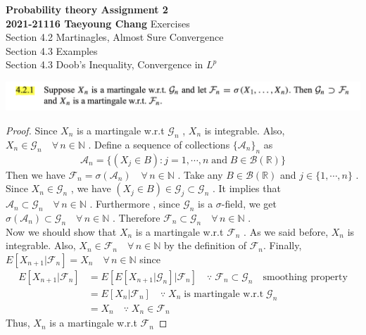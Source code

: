 \documentclass[12pt, A4]{article}
\newcommand{\N}{\mathbb{N}}
\newcommand{\R}{\mathbb{R}}
\newcommand{\A}{\mathcal{A}}
\newcommand{\B}{\mathcal{B}}
\newcommand{\G}{\mathcal{G}}
\newcommand{\F}{\mathcal{F}}
\newcommand{\foranyn}{\quad \forall \, n\in \N}
\begin{document}
\begin{titlepage}
	\begin{center}
		\vspace*{5cm}
		\textbf{\Large Probability theory \MakeUppercase{} Assignment 2}
		\\
		\vspace{1.5cm}
		\textbf{2021-21116 Taeyoung Chang}
		\vfill
		Exercises \\ Section 4.2 Martinagles, Almost Sure Convergence \\ Section 4.3 Examples \\ Section 4.3 Doob's Inequality, Convergence in $L^p$ 
	
		\vspace*{3cm}
		\thispagestyle{empty}
	\end{center}
\end{titlepage}

\includegraphics[width=17cm]{Exer4.2.1.png}

\begin{proof}
    Since $X_n$ is a martingale w.r.t $\G_n$ , $X_n$ is integrable. Also, $X_n\in \G_n\foranyn$ . Define a sequence of collections $\{\A_n\}_n$ as
    $$
        \A_n=\{(X_j\in B) : j=1, \cdots, n \; \text{and}\; B\in \B(\R)\}
    $$
    Then we have $\F_n=\sigma(\A_n)\foranyn$ . Take any $B\in \B(\R)$ and $j\in \{1, \cdots, n\}$ . Since $X_n\in \G_n$ , we have $(X_j\in B)\in \G_j\subset \G_n$ . It implies that $\A_n\subset \G_n\foranyn$ . Furthermore , since $\G_n$ is a $\sigma$-field, we get $\sigma(\A_n)\subset \G_n\foranyn$ . Therefore $\F_n\subset \G_n \foranyn$ . \\  
    Now we should show that $X_n$ is a martingale w.r.t $\F_n$ . As we said before, $X_n$ is integrable. Also, $X_n\in \F_n\foranyn$ by the definition of $\F_n$. Finally, $E[X_{n+1}|\F_n]=X_n \foranyn$ since
    \begin{align*}
        E[X_{n+1}|\F_n] &= E[E[X_{n+1}|\G_n]\big|\F_n] \quad \because \;\F_n\subset \G_n \quad \text{smoothing property} \\
        &= E[X_n|\F_n] \quad \because \; X_n\; \text{is martingale w.r.t} \; \G_n \\
        &= X_n \quad \because \; X_n\in \F_n
    \end{align*}
    Thus, $X_n$ is a martingale w.r.t $\F_n$
\end{proof}
\end{document}

